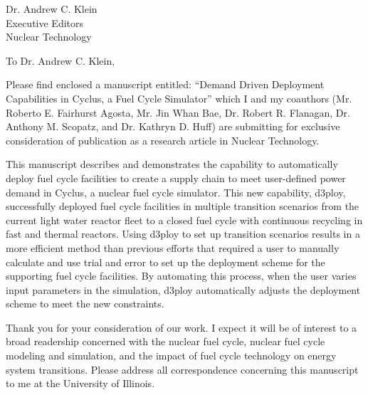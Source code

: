 \documentclass[11pt]{letter} %
\newcommand{\RecipientName}{Dr. Andrew C. Klein\xspace}
\newcommand{\RecipientAddress}{Executive Editors\\Nuclear Technology}
\begin{document}
\small
\begin{letter}{\RecipientName\\
        \RecipientAddress\xspace}

\address{Gwendolyn J. Chee\\
gchee2@illinois.edu\\
226 Talbot Laboratory\\
104 Wright Street, MC-234\\
Urbana, IL 61801}


\opening{To \RecipientName,}

Please find enclosed a manuscript entitled: ``Demand Driven Deployment Capabilities in Cyclus, 
a Fuel Cycle Simulator'' which I and my 
coauthors (Mr. Roberto E. Fairhurst Agosta, Mr. Jin Whan Bae, 
Dr. Robert R. Flanagan, Dr. Anthony M. Scopatz, and Dr. Kathryn D. Huff) are submitting for 
exclusive consideration of publication as a research article in Nuclear Technology. 

This manuscript describes and demonstrates the capability to automatically deploy fuel cycle 
facilities to create a supply chain to meet user-defined power demand in Cyclus, 
a nuclear fuel cycle simulator.
This new capability, d3ploy, successfully deployed fuel cycle facilities in
multiple transition scenarios from the current light water reactor 
fleet to a closed fuel cycle with continuous recycling in fast and thermal reactors.
Using d3ploy to set up transition scenarios results in a more
efficient method than previous efforts that required a user to manually calculate
and use trial and error to set up the deployment scheme for the supporting
fuel cycle facilities. By automating this process, when the user varies input
parameters in the simulation, d3ploy automatically adjusts the deployment
scheme to meet the new constraints.

Thank you for your consideration of our work.  I expect it will be of interest
to a broad readership concerned with the nuclear fuel cycle, 
nuclear fuel cycle modeling and simulation, and the impact of fuel cycle 
technology on energy system transitions. 
Please address all correspondence concerning this manuscript to me at the University of Illinois.




\end{letter}
\end{document}
